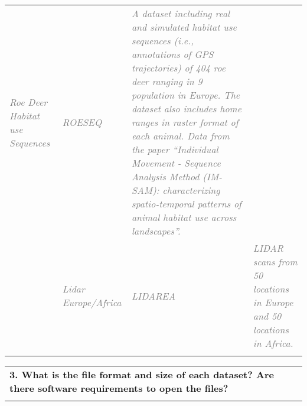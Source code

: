 \documentclass[12pt]{article}
\begin{document}
\begin{table}[H]
\begin{tabular}{p{0.20in}p{}p{0.80in}p{3.70in}}
\multicolumn{1}{|p{0.80in}}{\textit{\textcolor[HTML]{808080}{Roe Deer Habitat use Sequences}}} & %
\multicolumn{1}{|p{0.80in}|}{\textit{\textcolor[HTML]{808080}{ROESEQ}}} & %
\multicolumn{1}{|p{3.70in}|}{\textit{\textcolor[HTML]{808080}{A dataset including real and simulated habitat use sequences (i.e., annotations of GPS trajectories) of 404 roe deer ranging in 9 population in Europe. The dataset also includes home ranges in raster format of each animal. Data from the paper “Individual Movement - Sequence Analysis Method (IM-SAM): characterizing spatio-temporal patterns of animal habitat use across landscapes”.}}} \\ %
\hhline{----}
\multicolumn{1}{|p{0.20in}}{\textit{\textcolor[HTML]{808080}{D5}}} & %
\multicolumn{1}{|p{0.80in}}{\textit{\textcolor[HTML]{808080}{Lidar Europe/Africa}}} & %
\multicolumn{1}{|p{0.80in}|}{\textit{\textcolor[HTML]{808080}{LIDAREA}}} & %
\multicolumn{1}{|p{3.70in}|}{\textit{\textcolor[HTML]{808080}{LIDAR scans from 50 locations in Europe and 50 locations in Africa.}}} \\ %
\hhline{----}
\end{tabular}
\end{table}



\newpage



\begin{table}[H]
 			\centering
\begin{tabular}{p{5.99in}}
\hline
\multicolumn{1}{|p{5.99in}|}{\textbf{3. What is the file format and size of each dataset? Are there software requirements to open the files?}} \\
\hhline{-}
\end{tabular}
\end{table}

\end{document}

